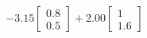\documentclass[preview]{standalone}
\begin{document}
\begin{align*}
-3.15 \begin{bmatrix} 0.8 \\ 0.5 \end{bmatrix} + 2.00 \begin{bmatrix} 1 \\ 1.6 \end{bmatrix}
\end{align*}
\end{document}
